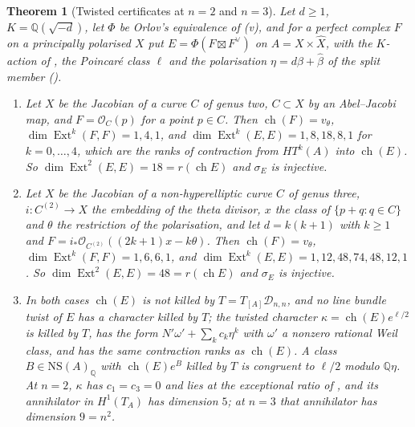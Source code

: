 \documentclass[11pt,reqno]{amsart}
\theoremstyle{plain}
\newtheorem{theorem}{Theorem}[section]
\theoremstyle{definition}
\theoremstyle{remark}
\newcommand{\QQ}{\mathbb{Q}}
\newcommand{\cO}{\mathcal{O}}
\newcommand{\cD}{\mathcal{D}}
\newcommand{\NS}{\mathrm{NS}}
\DeclareMathOperator{\ch}{ch}
\DeclareMathOperator{\Ext}{Ext}
\begin{document}
\begin{theorem}[Twisted certificates at $n=2$ and $n=3$]
\label{thm:twistedcert}
Let $d\ge1$, $K=\QQ(\sqrt{-d})$, let $\Phi$ be Orlov's equivalence of
(v), and for a perfect complex $F$ on a principally
polarised $X$ put $E=\Phi(F\boxtimes F^{\vee})$ on $A=X\times\widehat{X}$,
with the $K$-action of \cite[(29)]{paperI}, the Poincar\'e class $\ell$ and the
polarisation $\eta=d\beta+\widehat\beta$ of the split member
(\cite[Notation~15.1]{paperI}).
\begin{enumerate}[label=\textup{(\roman*)},leftmargin=2.6em,itemsep=2pt]
\item Let $X$ be the Jacobian of a curve $C$ of genus two, $C\subset X$ by an
  Abel--Jacobi map, and $F=\cO_{C}(p)$ for a point $p\in C$. Then
  $\ch(F)=v_{\theta}$, $\dim\Ext^{k}(F,F)=1,4,1$, and
  $\dim\Ext^{k}(E,E)=1,8,18,8,1$ for $k=0,\dots,4$, which are the ranks of
  contraction from $HT^{k}(A)$ into $\ch(E)$. So
  $\dim\Ext^{2}(E,E)=18=r(\ch E)$ and $\sigma_{E}$ is injective.
\item Let $X$ be the Jacobian of a non-hyperelliptic curve $C$ of genus three,
  $i\colon C^{(2)}\to X$ the embedding of the theta divisor, $x$ the class of
  $\{p+q:q\in C\}$ and $\theta$ the restriction of the polarisation, and let
  $d=k(k+1)$ with $k\ge1$ and $F=i_{*}\cO_{C^{(2)}}((2k+1)x-k\theta)$. Then
  $\ch(F)=v_{\theta}$, $\dim\Ext^{k}(F,F)=1,6,6,1$, and
  $\dim\Ext^{k}(E,E)=1,12,48,74,48,12,1$. So $\dim\Ext^{2}(E,E)=48=r(\ch E)$
  and $\sigma_{E}$ is injective.
\item In both cases $\ch(E)$ is not killed by $T=T_{[A]}\cD_{n,n}$, and no
  line bundle twist of $E$ has a character killed by $T$; the twisted
  character $\kappa=\ch(E)e^{\ell/2}$ is killed by $T$, has the form
  $N'\omega'+\sum_{k}c_{k}\eta^{k}$ with $\omega'$ a nonzero rational Weil
  class, and has the same contraction ranks as $\ch(E)$. A class
  $B\in\NS(A)_{\QQ}$ with $\ch(E)e^{B}$ killed by $T$ is congruent to $\ell/2$
  modulo $\QQ\eta$. At $n=2$,
  $\kappa$ has $c_{1}=c_{3}=0$ and lies at the exceptional ratio of
  , and its annihilator in $H^{1}(T_{A})$ has
  dimension $5$; at $n=3$ that annihilator has dimension $9=n^{2}$.
\end{enumerate}
\end{theorem}
\end{document}
